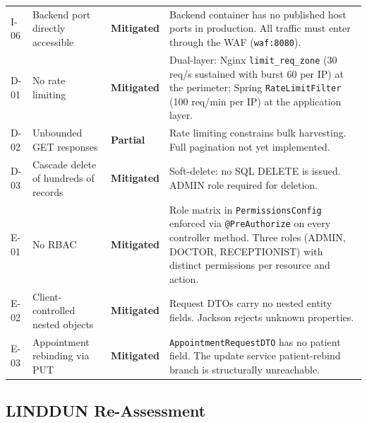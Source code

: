 \documentclass[12pt,a4paper]{report}
\begin{document}
\begin{longtable}{S{1.3cm} S{3.0cm} S{2.0cm} p{6.7cm}}
I-06 & Backend port directly accessible & \textbf{\textcolor{sevlow}{Mitigated}} &
  Backend container has no published host ports in production. All traffic must enter
  through the WAF (\texttt{waf:8080}). \\[6pt]

D-01 & No rate limiting & \textbf{\textcolor{sevlow}{Mitigated}} &
  Dual-layer: Nginx \texttt{limit\_req\_zone} (30 req/s sustained with burst 60 per IP)
  at the perimeter; Spring \texttt{RateLimitFilter} (100 req/min per IP) at the
  application layer. \\[6pt]

D-02 & Unbounded GET responses & \textbf{\textcolor{sevmedium}{Partial}} &
  Rate limiting constrains bulk harvesting. Full pagination not yet implemented. \\[6pt]

D-03 & Cascade delete of hundreds of records & \textbf{\textcolor{sevlow}{Mitigated}} &
  Soft-delete: no SQL DELETE is issued. ADMIN role required for deletion. \\[6pt]

E-01 & No RBAC & \textbf{\textcolor{sevlow}{Mitigated}} &
  Role matrix in \texttt{PermissionsConfig} enforced via \texttt{@PreAuthorize} on
  every controller method. Three roles (ADMIN, DOCTOR, RECEPTIONIST) with distinct
  permissions per resource and action. \\[6pt]

E-02 & Client-controlled nested objects & \textbf{\textcolor{sevlow}{Mitigated}} &
  Request DTOs carry no nested entity fields. Jackson rejects unknown properties. \\[6pt]

E-03 & Appointment rebinding via PUT & \textbf{\textcolor{sevlow}{Mitigated}} &
  \texttt{AppointmentRequestDTO} has no patient field. The update service patient-rebind
  branch is structurally unreachable. \\

\end{longtable}

\subsection{LINDDUN Re-Assessment}
\end{document}
